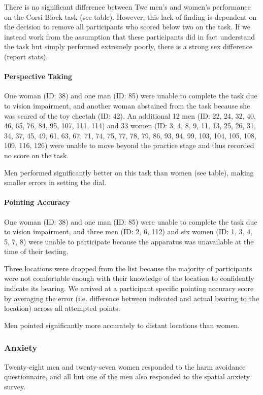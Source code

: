 There is no significant difference between Twe men's and women's performance on the Corsi Block task (see table).  However, this lack of finding is dependent on the decision to remove all participants who scored below two on the task.  If we instead work from the assumption that these participants did in fact understand the task but simply performed extremely poorly, there is a strong sex difference (report stats).

\paragraph{Perspective Taking}
One woman (ID: 38) and one man (ID: 85) were unable to complete the task due to vision impairment, and another woman abstained from the task because she was scared of the toy cheetah (ID: 42).  An additional 12 men (ID: 22, 24, 32, 40, 46, 65, 76, 84, 95, 107, 111, 114) and 33 women (ID: 3, 4, 8, 9, 11, 13, 25, 26, 31, 34, 37, 45, 49, 61, 63, 67, 71, 74, 75, 77, 78, 79, 86, 93, 94, 99, 103, 104, 105, 108, 109, 116, 126) were unable to move beyond the practice stage and thus recorded no score on the task.

Men performed significantly better on this task than women (see table), making smaller errors in setting the dial.

\paragraph{Pointing Accuracy}

One woman (ID: 38) and one man (ID: 85) were unable to complete the task due to vision impairment, and three men (ID: 2, 6, 112) and six women (ID: 1, 3, 4, 5, 7, 8) were unable to participate because the apparatus was unavailable at the time of their testing.

Three locations were dropped from the list because the majority of participants were not comfortable enough with their knowledge of the location to confidently indicate its bearing.  We arrived at a participant specific pointing accuracy score by averaging the error (i.e. difference between indicated and actual bearing to the location) across all attempted points.

Men pointed significantly more accurately to distant locations than women.

		\subsubsection{Anxiety}
		\label{sec:3.1.2}
Twenty-eight men and twenty-seven women responded to the harm avoidance questionnaire, and all but one of the men also responded to the spatial anxiety survey. 

